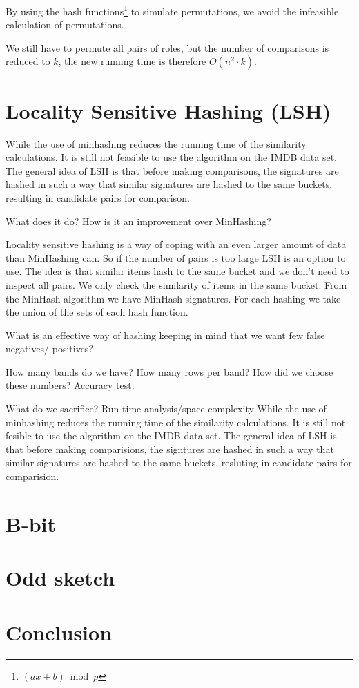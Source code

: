 \documentclass[a4paper,11pt]{article}
\begin{document}
By using the hash functions\footnote{$(ax + b) \bmod p$} to simulate permutations, we avoid the infeasible calculation of permutations.

We still have to permute all pairs of roles, but the number of comparisons is reduced to $k$, the new running time is therefore $O(n^2 \cdot k)$.

\section{Locality Sensitive Hashing (LSH)}

While the use of minhashing reduces the running time of the similarity calculations. It is still not feasible to use the algorithm on the IMDB data set. The general idea of LSH is that before making comparisons, the signatures are hashed in such a way that similar signatures are hashed to the same buckets, resulting in candidate pairs for comparison.

What does it do? How is it an improvement over MinHashing?

Locality sensitive hashing is a way of coping with an even larger amount of data than MinHashing can. So if the number of pairs is too large LSH is an option to use. The idea is that similar items hash to the same bucket and we don’t need to inspect all pairs. We only check the similarity of items in the same bucket. From the MinHash algorithm we have MinHash signatures. For each hashing we take the union of the sets of each hash function.

What is an effective way of hashing keeping in mind that we want few false negatives/
positives? 

How many bands do we have? How many rows per band? How did we choose these numbers? Accuracy test. 

What do we sacrifice?
Run time analysis/space complexity
While the use of minhashing reduces the running time of the similarity calculations. It is still not fesible to use the algorithm on the IMDB data set. The general idea of LSH is that before making comparisions, the signtures are hashed in such a way that similar signatures are hashed to the same buckets, resluting in candidate pairs for comparision.

\section{B-bit}

\section{Odd sketch}

\section{Conclusion}
\end{document}
